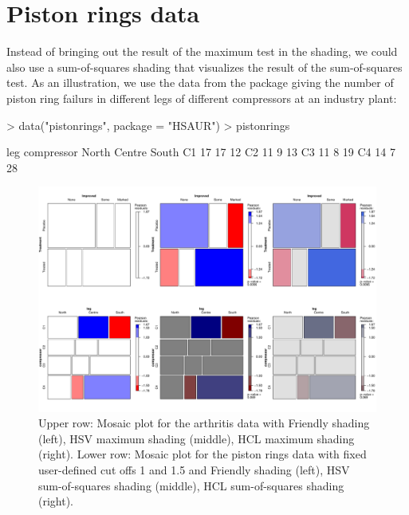 \documentclass{Z}
\begin{document}
\section{Piston rings data} \label{sec:arthritis}

Instead of bringing out the result of the maximum test in the shading, we could also use
a sum-of-squares shading that visualizes the result of the sum-of-squares test. As an illustration,
we use the  data from the  \citep{vcd:Everitt+Hothorn:2006}
package giving the number of piston ring failurs in different legs of different compressors
at an industry plant:

\begin{Schunk}
\begin{Sinput}
> data("pistonrings", package = "HSAUR")
> pistonrings
\end{Sinput}
\begin{Soutput}
          leg
compressor North Centre South
        C1    17     17    12
        C2    11      9    13
        C3    11      8    19
        C4    14      7    28
\end{Soutput}
\end{Schunk}

\begin{figure}
\begin{center}
\includegraphics[width=.9\textwidth,keepaspectratio]{residual-shadings-shadings}
\caption{Upper row: Mosaic plot for the arthritis data with Friendly shading (left),
HSV maximum shading (middle), HCL maximum shading (right). Lower row: Mosaic
plot for the piston rings data with fixed user-defined cut offs 1 and 1.5 and 
Friendly shading (left), HSV sum-of-squares shading (middle), HCL sum-of-squares shading
(right).}
\label{fig:shadings}
\end{center}
\end{figure}
\end{document}
